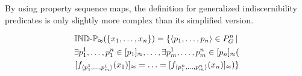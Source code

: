 By using property sequence maps,
  the definition for generalized indiscernibility predicates
  is only slightly more complex than its simplified version.

\begin{definition}
\label{def:indiscernibility_criteria}
\begin{align}
  \indp_{\approx}(\set{\range{x_1}{x_n}})
=
  \setdef{
    \tuplerange{p_1}{p_n} \in P_G^n
  }{\nonumber\\
      \exists \range{p_1^1}{p_1^n} \in \equivset{p_1},
    \ldots,
      \exists \range{p_m^1}{p_m^n} \in \equivset{p_n}
    (\nonumber\\
        \equivset{f_{\tuplerange{p_1^1}{p_m^1}} (x_1)}
      =
        \ldots
      =
        \equivset{f_{\tuplerange{p_1^n}{p_m^n}} (x_n)}
    )
  }\nonumber
\end{align}
\end{definition}


